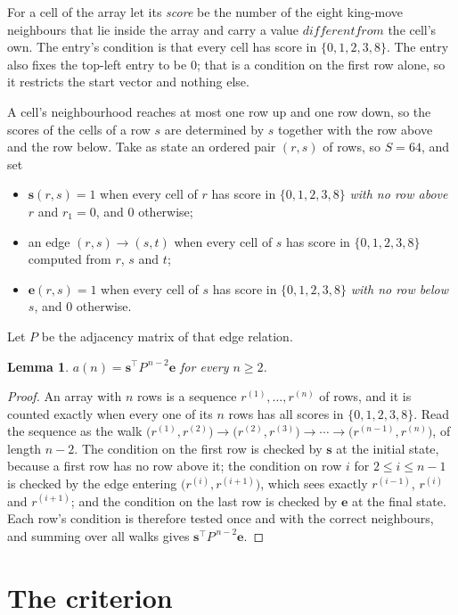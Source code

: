 \documentclass[11pt,a4paper]{article}
\theoremstyle{plain}
\newtheorem{lemma}[theorem]{Lemma}
\theoremstyle{definition}
\begin{document}
For a cell of the array let its \emph{score} be the number of the eight king-move neighbours that lie inside
the array and carry a value $different from$ the cell's own. The entry's condition is that every cell
has score in $\{0,1,2,3,8\}$. The entry also fixes the top-left entry to be $0$; that is a condition on the first row alone, so it restricts the start vector and nothing else.

A cell's neighbourhood reaches at most one row up and one row down, so the scores of the
cells of a row $s$ are determined by $s$ together with the row above and the row below.
Take as state an ordered pair $(r,s)$ of rows, so $S=64$, and set
\begin{itemize}
\item $\mathbf{s}(r,s)=1$ when every cell of $r$ has score in $\{0,1,2,3,8\}$ \emph{with no row
above $r$} and $r_1=0$, and $0$ otherwise;
\item an edge $(r,s)\to(s,t)$ when every cell of $s$ has score in $\{0,1,2,3,8\}$ computed from
$r$, $s$ and $t$;
\item $\mathbf{e}(r,s)=1$ when every cell of $s$ has score in $\{0,1,2,3,8\}$ \emph{with no row
below $s$}, and $0$ otherwise.
\end{itemize}
Let $P$ be the adjacency matrix of that edge relation.

\begin{lemma}\label{lem:walk}
$a(n)=\mathbf{s}^{\!\top}P^{\,n-2}\mathbf{e}$ for every $n\ge2$.
\end{lemma}

\begin{proof}
An array with $n$ rows is a sequence $r^{(1)},\dots,r^{(n)}$ of rows, and it is counted
exactly when every one of its $n$ rows has all scores in $\{0,1,2,3,8\}$. Read the sequence as the
walk $\bigl(r^{(1)},r^{(2)}\bigr)\to\bigl(r^{(2)},r^{(3)}\bigr)\to\cdots\to
\bigl(r^{(n-1)},r^{(n)}\bigr)$, of length $n-2$. The condition on the first row is
checked by $\mathbf{s}$ at the initial state, because a first row has no row above it; the
condition on row $i$ for $2\le i\le n-1$ is checked by the edge entering
$\bigl(r^{(i)},r^{(i+1)}\bigr)$, which sees exactly $r^{(i-1)}$, $r^{(i)}$ and
$r^{(i+1)}$; and the condition on the last row is checked by $\mathbf{e}$ at the final
state. Each row's condition is therefore tested once and with the correct neighbours, and
summing over all walks gives $\mathbf{s}^{\!\top}P^{\,n-2}\mathbf{e}$.
\end{proof}

\section{The criterion}
\end{document}
